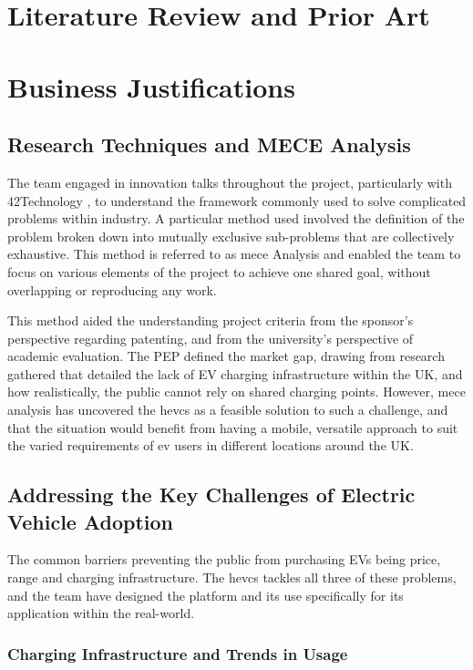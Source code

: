 \documentclass [12pt]{article}
\begin{document}
\newpage
\section{Literature Review and Prior Art}


\newpage
\section{Business Justifications}

\subsection{Research Techniques and MECE Analysis}

The team engaged in innovation talks throughout the project, particularly with 42Technology \cite{42T}, to understand the framework commonly used to solve complicated problems within industry. A particular method used involved the definition of the problem broken down into mutually exclusive sub-problems that are collectively exhaustive. This method is referred to as \gls{mece} Analysis and enabled the team to focus on various elements of the project to achieve one shared goal, without overlapping or reproducing any work.

This method aided the understanding project criteria from the sponsor’s perspective regarding patenting, and from the university’s perspective of academic evaluation. The PEP defined the market gap, drawing from research gathered that detailed the lack of EV charging infrastructure within the UK, and how realistically, the public cannot rely on shared charging points. However, \gls{mece} analysis has uncovered the \gls{hevcs} as a feasible solution to such a challenge, and that the situation would benefit from having a mobile, versatile approach to suit the varied requirements of \gls{ev} users in different locations around the UK.

\subsection{Addressing the Key Challenges of Electric Vehicle Adoption}

The common barriers preventing the public from purchasing EVs being price, range and charging infrastructure. The \gls{hevcs} tackles all three of these problems, and the team have designed the platform and its use specifically for its application within the real-world.

\subsubsection{Charging Infrastructure and Trends in Usage}
\end{document}
